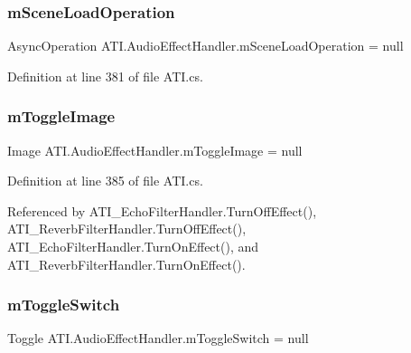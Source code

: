 \subsubsection{\texorpdfstring{m\+Scene\+Load\+Operation}{mSceneLoadOperation}}
{\footnotesize\ttfamily Async\+Operation A\+T\+I.\+Audio\+Effect\+Handler.\+m\+Scene\+Load\+Operation = null\hspace{0.3cm}{\ttfamily [protected]}}



Definition at line 381 of file A\+T\+I.\+cs.

\mbox{\label{class_a_t_i_1_1_audio_effect_handler_aa5bf03976a14594f089aac5681c15a83}} 
\subsubsection{\texorpdfstring{m\+Toggle\+Image}{mToggleImage}}
{\footnotesize\ttfamily Image A\+T\+I.\+Audio\+Effect\+Handler.\+m\+Toggle\+Image = null\hspace{0.3cm}{\ttfamily [protected]}}



Definition at line 385 of file A\+T\+I.\+cs.



Referenced by A\+T\+I\+\_\+\+Echo\+Filter\+Handler.\+Turn\+Off\+Effect(), A\+T\+I\+\_\+\+Reverb\+Filter\+Handler.\+Turn\+Off\+Effect(), A\+T\+I\+\_\+\+Echo\+Filter\+Handler.\+Turn\+On\+Effect(), and A\+T\+I\+\_\+\+Reverb\+Filter\+Handler.\+Turn\+On\+Effect().

\mbox{\label{class_a_t_i_1_1_audio_effect_handler_ae5f6b965d3401ff17fde2e77f33f9109}} 
\subsubsection{\texorpdfstring{m\+Toggle\+Switch}{mToggleSwitch}}
{\footnotesize\ttfamily Toggle A\+T\+I.\+Audio\+Effect\+Handler.\+m\+Toggle\+Switch = null\hspace{0.3cm}{\ttfamily [protected]}}



